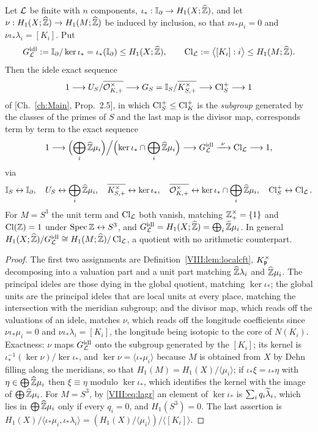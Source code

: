 \begin{theorem}\label{VIII:thm:dict}
Let $\mathcal{L}$ be finite with $n$ components, $\iota_*:\mathbb{I}_\partial\to H_1(X;\widehat{\mathbb{Z}})$, and let
$\nu:H_1(X;\widehat{\mathbb{Z}})\to H_1(M;\widehat{\mathbb{Z}})$ be induced by inclusion, so that $\nu\iota_*\mu_i=0$ and
$\nu\iota_*\lambda_i=[K_i]$. Put
\[
G_{\mathcal{L}}^{\mathrm{idl}}:=\mathbb{I}_\partial/\ker\iota_*=\iota_*(\mathbb{I}_\partial)\le H_1(X;\widehat{\mathbb{Z}}),\qquad
\operatorname{Cl}_{\mathcal{L}}:=\bigl\langle[K_i]:i\bigr\rangle\le H_1(M;\widehat{\mathbb{Z}}).
\]
Then the idele exact sequence
\[
1\longrightarrow U_S/\overline{\mathcal{O}^\times_{K,+}}\longrightarrow G_S=\mathbb{I}_S/\overline{K^\times_{S,+}}\longrightarrow\operatorname{Cl}^+_S\longrightarrow1
\]
of [Ch.~\ref{ch:Main}, Prop.~2.5], in which $\operatorname{Cl}^+_S\le\operatorname{Cl}^+_K$ is the \emph{subgroup} generated by
the classes of the primes of $S$ and the last map is the divisor map, corresponds term by
term to the exact sequence
\[
1\longrightarrow\Bigl(\bigoplus_i\widehat{\mathbb{Z}}\mu_i\Bigr)\Big/\Bigl(\ker\iota_*\cap\bigoplus_i\widehat{\mathbb{Z}}\mu_i\Bigr)
\longrightarrow G_{\mathcal{L}}^{\mathrm{idl}}
\xrightarrow{\ \nu\ }\operatorname{Cl}_{\mathcal{L}}\longrightarrow1,
\]
via
\[
\mathbb{I}_S\leftrightarrow\mathbb{I}_\partial,\quad
U_S\leftrightarrow\bigoplus_i\widehat{\mathbb{Z}}\mu_i,\quad
\overline{K^\times_{S,+}}\leftrightarrow\ker\iota_*,\quad
\overline{\mathcal{O}^\times_{K,+}}\leftrightarrow\ker\iota_*\cap\bigoplus_i\widehat{\mathbb{Z}}\mu_i,\quad
\operatorname{Cl}^+_S\leftrightarrow\operatorname{Cl}_{\mathcal{L}} .
\]
For $M=S^3$ the unit term and $\operatorname{Cl}_{\mathcal{L}}$ both vanish, matching $\mathbb{Z}^\times_+=\{1\}$ and
$\operatorname{Cl}(\mathbb{Z})=1$ under $\operatorname{Spec}\mathbb{Z}\leftrightarrow S^3$, and $G_{\mathcal{L}}^{\mathrm{idl}}=H_1(X;\widehat{\mathbb{Z}})=\bigoplus_i\widehat{\mathbb{Z}}\mu_i$.
In general $H_1(X;\widehat{\mathbb{Z}})/G_{\mathcal{L}}^{\mathrm{idl}}\cong H_1(M;\widehat{\mathbb{Z}})/\operatorname{Cl}_{\mathcal{L}}$, a quotient with no
arithmetic counterpart.
\end{theorem}

\begin{proof}
The first two assignments are Definition~\ref{VIII:lem:localcft}, $K_{\mathfrak{p}}^\times$ decomposing into
a valuation part and a unit part matching $\widehat{\mathbb{Z}}\lambda_i$ and $\widehat{\mathbb{Z}}\mu_i$. The principal ideles
are those dying in the global quotient, matching $\ker\iota_*$; the global units are the
principal ideles that are local units at every place, matching the intersection with the
meridian subgroup; and the divisor map, which reads off the valuations of an idele, matches
$\nu$, which reads off the longitude coefficients since $\nu\iota_*\mu_i=0$ and
$\nu\iota_*\lambda_i=[K_i]$, the longitude being isotopic to the core of $N(K_i)$. Exactness:
$\nu$ maps $G_{\mathcal{L}}^{\mathrm{idl}}$ onto the subgroup generated by the $[K_i]$; its kernel is
$\iota_*^{-1}(\ker\nu)/\ker\iota_*$, and $\ker\nu=\langle\iota_*\mu_i\rangle$ because $M$ is
obtained from $X$ by Dehn filling along the meridians, so that $H_1(M)=H_1(X)/\langle\mu_i\rangle$;
if $\iota_*\xi=\iota_*\eta$ with $\eta\in\bigoplus\widehat{\mathbb{Z}}\mu_i$ then $\xi\equiv\eta$ modulo
$\ker\iota_*$, which identifies the kernel with the image of $\bigoplus\widehat{\mathbb{Z}}\mu_i$. For
$M=S^3$, by \eqref{VIII:eq:lagr} an element of $\ker\iota_*$ is $\sum_iq_i\widetilde\lambda_i$, which lies in
$\bigoplus\widehat{\mathbb{Z}}\mu_i$ only if every $q_i=0$, and $H_1(S^3)=0$. The last assertion is
$H_1(X)/\langle\iota_*\mu_i,\iota_*\lambda_i\rangle=(H_1(X)/\langle\mu_i\rangle)/\langle[K_i]\rangle$.
\end{proof}

